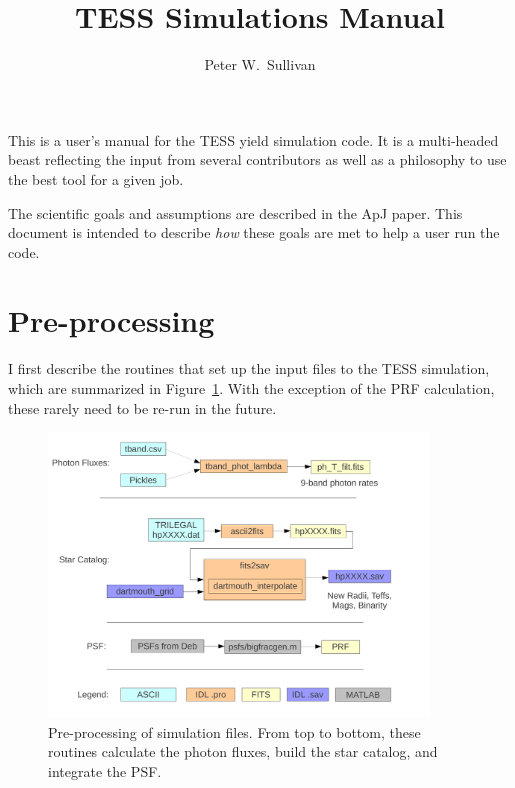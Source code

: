 \documentclass[preprint,10pt]{aastex}
\begin{document}
%
\def\ltsima{$\; \buildrel < \over \sim \;$}
\def\lsim{\lower.5ex\hbox{\ltsima}}
\def\gtsima{$\; \buildrel > \over \sim \;$}
\def\gsim{\lower.5ex\hbox{\gtsima}}

%



\title{TESS Simulations Manual}

\author{Peter W.\ Sullivan}




This is a user's manual for the TESS yield simulation code. 
It is a multi-headed beast reflecting the input from several contributors as well as a philosophy
to use the best tool for a given job. 

The scientific goals and assumptions are described in the ApJ paper. This document is intended to describe \emph{how} these goals are met to help a user run the code.

\section{Pre-processing}
I first describe the routines that set up the input files to the TESS simulation, which are summarized in Figure~\ref{fig:preprocess}.
With the exception of the PRF calculation, these rarely need to be re-run in the future.

\begin{figure}
\begin{center}
\includegraphics[width=0.9\textwidth]{preprocess.pdf}
\end{center}
\caption{Pre-processing of simulation files. From top to bottom, these routines calculate the photon fluxes, build the star catalog, and integrate the PSF.}
\label{fig:preprocess}
\end{figure}
\end{document}
